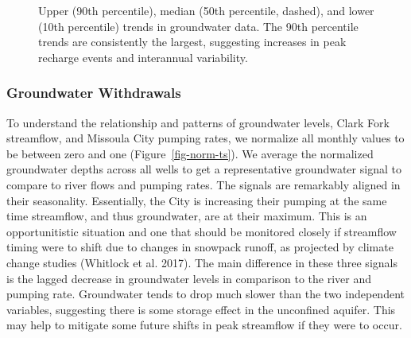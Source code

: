 \documentclass[
  letterpaper,
  DIV=11,
  numbers=noendperiod]{scrartcl}
\begin{document}
\begin{figure}


\caption{\label{fig-gw-quantreg}Upper (90th percentile), median (50th
percentile, dashed), and lower (10th percentile) trends in groundwater
data. The 90th percentile trends are consistently the largest,
suggesting increases in peak recharge events and interannual
variability.}

\end{figure}%

\subsubsection{Groundwater Withdrawals}\label{groundwater-withdrawals}

To understand the relationship and patterns of groundwater levels, Clark
Fork streamflow, and Missoula City pumping rates, we normalize all
monthly values to be between zero and one (Figure~\ref{fig-norm-ts}). We
average the normalized groundwater depths across all wells to get a
representative groundwater signal to compare to river flows and pumping
rates. The signals are remarkably aligned in their seasonality.
Essentially, the City is increasing their pumping at the same time
streamflow, and thus groundwater, are at their maximum. This is an
opportunitistic situation and one that should be monitored closely if
streamflow timing were to shift due to changes in snowpack runoff, as
projected by climate change studies (Whitlock et al. 2017). The main
difference in these three signals is the lagged decrease in groundwater
levels in comparison to the river and pumping rate. Groundwater tends to
drop much slower than the two independent variables, suggesting there is
some storage effect in the unconfined aquifer. This may help to mitigate
some future shifts in peak streamflow if they were to occur.
\end{document}
